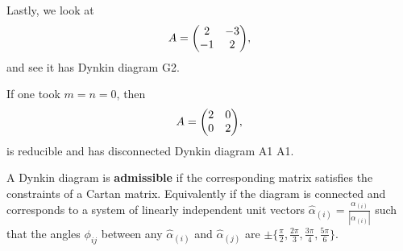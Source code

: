 Lastly, we look at
\begin{align}
    A = \mqty( 2 & -3 \\ - 1 & 2)
,\end{align}
 and see it has Dynkin diagram \dynkin G2.

 \begin{note}
     If one took $m = n = 0$, then
     \begin{align}
         A = \mqty( 2 & 0 \\ 0 & 2)
     ,\end{align}
     is reducible and has disconnected Dynkin diagram \dynkin A1 \dynkin A1.
 \end{note}

 \begin{definition}
     A Dynkin diagram is \textbf{admissible} if the corresponding matrix satisfies the constraints of a Cartan matrix. Equivalently if the diagram is connected and corresponds to a system of linearly independent unit vectors $\hat{\alpha}_{\left( i \right) } = \frac{\alpha_{\left( i \right) }}{\left| \alpha_{\left( i \right) } \right| }$ such that the angles $\phi_{ij}$ between any $\hat{\alpha}_{\left( i \right) }$ and $\hat{\alpha}_{\left( j \right) }$ are $\pm \{\frac{\pi}{2}, \frac{2\pi}{3}, \frac{3\pi}{4}, \frac{5\pi}{6}\} $.
 \end{definition}

